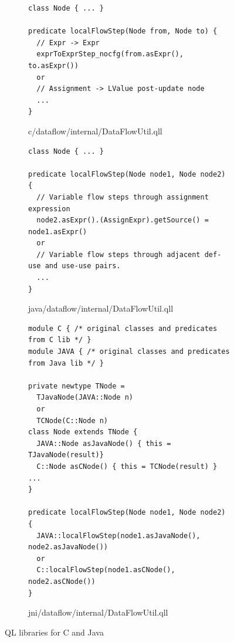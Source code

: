 \begin{figure}[hbt!]
  \centering
  \begin{subfigure}{0.94\textwidth}
\begin{lstlisting}[style=codeql,xleftmargin=2.5em]
class Node { ... }

predicate localFlowStep(Node from, Node to) {
  // Expr -> Expr
  exprToExprStep_nocfg(from.asExpr(), to.asExpr())
  or
  // Assignment -> LValue post-update node
  ...
}
\end{lstlisting}
    \vspace*{-.5em}
    \caption{\normalsize c/dataflow/internal/DataFlowUtil.qll}
    \label{fig:qll1}
  \end{subfigure}
  \begin{subfigure}{0.94\textwidth}
\begin{lstlisting}[style=codeql,xleftmargin=2.5em]
class Node { ... }

predicate localFlowStep(Node node1, Node node2) {
  // Variable flow steps through assignment expression
  node2.asExpr().(AssignExpr).getSource() = node1.asExpr()
  or
  // Variable flow steps through adjacent def-use and use-use pairs.
  ...
}
\end{lstlisting}
    \vspace*{-.5em}
    \caption{\normalsize java/dataflow/internal/DataFlowUtil.qll}
    \label{fig:qll2}
  \end{subfigure}
  \begin{subfigure}{0.94\textwidth}
\begin{lstlisting}[style=codeql,xleftmargin=2.5em]
module C { /* original classes and predicates from C lib */ }
module JAVA { /* original classes and predicates from Java lib */ }

private newtype TNode =
  TJavaNode(JAVA::Node n)
  or
  TCNode(C::Node n)
class Node extends TNode {
  JAVA::Node asJavaNode() { this = TJavaNode(result)}
  C::Node asCNode() { this = TCNode(result) } ...
}

predicate localFlowStep(Node node1, Node node2) {
  JAVA::localFlowStep(node1.asJavaNode(), node2.asJavaNode())
  or
  C::localFlowStep(node1.asCNode(), node2.asCNode())
}
\end{lstlisting}
    \vspace*{-.5em}
    \caption{\normalsize jni/dataflow/internal/DataFlowUtil.qll}
    \label{fig:qll3}
  \end{subfigure}
  \vspace*{-.5em}
  \caption{QL libraries for C and Java}
  \label{fig:qll}
\end{figure}

